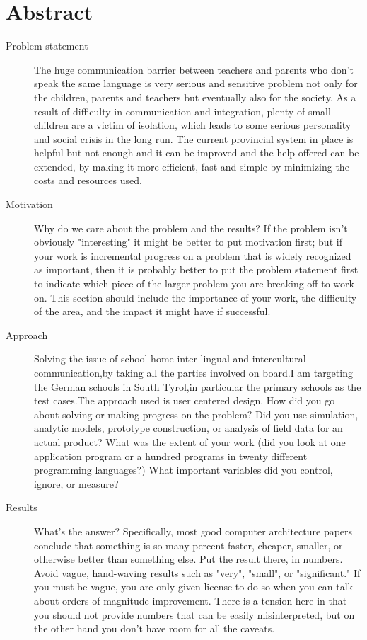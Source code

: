 \chapter*{Abstract}

\begin{description}

  \item[Problem statement] The huge communication barrier between
  teachers and parents who don't speak the same language is very serious
  and sensitive problem not only for the children, parents and teachers 
  but eventually also for the society.\newline
  As a result of difficulty in communication and integration, plenty of
  small children are a victim of isolation, which leads to some serious 
  personality and social crisis in the long run. \newline
  The current provincial system in place is helpful but not enough and 
  it can be improved and the help offered can be extended, by making it
  more efficient, fast and simple by minimizing the costs and resources 
  used. 
 

  \item[Motivation] Why do we care about the problem and the results?
  If the problem isn't obviously "interesting" it might be better to put
  motivation first; but if your work is incremental progress on a problem that
  is widely recognized as important, then it is probably better to put the
  problem statement first to indicate which piece of the larger problem you are
  breaking off to work on. This section should include the importance of your
  work, the difficulty of the area, and the impact it might have if successful.

  \item[Approach]Solving the issue of school-home inter-lingual and intercultural
  communication,by taking all the parties involved on board.I am targeting
  the German schools in South Tyrol,in particular the primary schools as the
  test cases.The approach used is user centered design.\newline
  How did you go about solving or making progress on the problem? Did you use simulation, analytic models, prototype construction,
  or analysis of field data for an actual product? What was the extent of your
  work (did you look at one application program or a hundred programs in twenty
  different programming languages?) What important variables did you control,
  ignore, or measure?

  \item[Results] What's the answer? Specifically, most good computer
  architecture papers conclude that something is so many percent faster,
  cheaper, smaller, or otherwise better than something else. Put the result
  there, in numbers. Avoid vague, hand-waving results such as "very", "small",
  or "significant." If you must be vague, you are only given license to do so
  when you can talk about orders-of-magnitude improvement. There is a tension
  here in that you should not provide numbers that can be easily misinterpreted,
  but on the other hand you don't have room for all the caveats.


\end{description}
